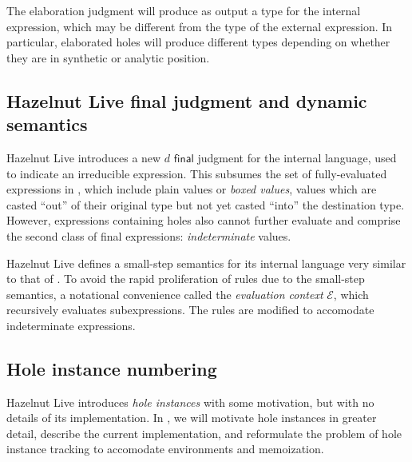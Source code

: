 The elaboration judgment will produce as output a type for the internal expression, which may be different from the type of the external expression. In particular, elaborated holes will produce different types depending on whether they are in synthetic or analytic position.

\subsection{Hazelnut Live final judgment and dynamic semantics}
\label{sec:hazel-dynamics}

Hazelnut Live introduces a new $d\textsf{ final}$ judgment for the internal language, used to indicate an irreducible expression. This subsumes the set of fully-evaluated expressions in \gtclc, which include plain values or \textit{boxed values}, values which are casted ``out'' of their original type but not yet casted ``into'' the destination type. However, expressions containing holes also cannot further evaluate and comprise the second class of final expressions: \textit{indeterminate} values.


Hazelnut Live defines a small-step semantics for its internal language very similar to that of \gtclc. To avoid the rapid proliferation of rules due to the small-step semantics, a notational convenience called the \textit{evaluation context} $\mathcal{E}$, which recursively evaluates subexpressions. The rules are modified to accomodate indeterminate expressions.


\subsection{Hole instance numbering}
\label{sec:hole-instance-numbering}

Hazelnut Live introduces \textit{hole instances} with some motivation, but with no details of its implementation. In , we will motivate hole instances in greater detail, describe the current implementation, and reformulate the problem of hole instance tracking to accomodate environments and memoization.

